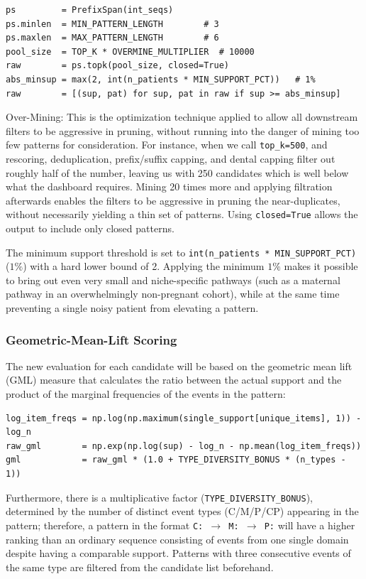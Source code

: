 \begin{lstlisting}[style=pythonstyle]
ps         = PrefixSpan(int_seqs)
ps.minlen  = MIN_PATTERN_LENGTH        # 3
ps.maxlen  = MAX_PATTERN_LENGTH        # 6
pool_size  = TOP_K * OVERMINE_MULTIPLIER  # 10000
raw        = ps.topk(pool_size, closed=True)
abs_minsup = max(2, int(n_patients * MIN_SUPPORT_PCT))   # 1%
raw        = [(sup, pat) for sup, pat in raw if sup >= abs_minsup]
\end{lstlisting}

\noindent Over-Mining: This is the optimization technique applied to allow all downstream filters to be aggressive in pruning, without running into the danger of mining too few patterns for consideration. For instance, when we call \texttt{top\_k=500}, and rescoring, deduplication, prefix/suffix capping, and dental capping filter out roughly half of the number, leaving us with 250 candidates which is well below what the dashboard requires. Mining 20 times more and applying filtration afterwards enables the filters to be aggressive in pruning the near-duplicates, without necessarily yielding a thin set of patterns. Using \texttt{closed=True} allows the output to include only closed patterns.

The minimum support threshold is set to \texttt{int(n\_patients * MIN\_SUPPORT\_PCT)} (\(1\%\)) with a hard lower bound of 2. Applying the minimum \(1\%\) makes it possible to bring out even very small and niche-specific pathways (such as a maternal pathway in an overwhelmingly non-pregnant cohort), while at the same time preventing a single noisy patient from elevating a pattern.

\subsubsection*{Geometric-Mean-Lift Scoring}

The new evaluation for each candidate will be based on the geometric mean lift (GML) measure that calculates the ratio between the actual support and the product of the marginal frequencies of the events in the pattern:

\begin{lstlisting}[style=pythonstyle]
log_item_freqs = np.log(np.maximum(single_support[unique_items], 1)) - log_n
raw_gml        = np.exp(np.log(sup) - log_n - np.mean(log_item_freqs))
gml            = raw_gml * (1.0 + TYPE_DIVERSITY_BONUS * (n_types - 1))
\end{lstlisting}

Furthermore, there is a multiplicative factor (\texttt{TYPE\_DIVERSITY\_BONUS}), determined by the number of distinct event types (C/M/P/CP) appearing in the pattern; therefore, a pattern in the format \texttt{C: \(\rightarrow\) M: \(\rightarrow\) P:} will have a higher ranking than an ordinary sequence consisting of events from one single domain despite having a comparable support. Patterns with three consecutive events of the same type are filtered from the candidate list beforehand.

